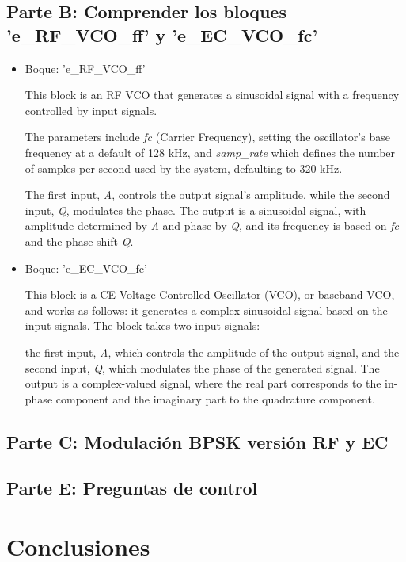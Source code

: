\documentclass{journal}[IEEEtran, twocolumn]             %
\begin{document}
\begin{multicols}{2}
   
\subsection{Parte B: Comprender los bloques 'e\_RF\_VCO\_ff' y 'e\_EC\_VCO\_fc'}

\begin{itemize}
 
   \item Boque: 'e\_RF\_VCO\_ff'

This block is an RF VCO that generates a sinusoidal signal with a frequency controlled by input signals. 

The parameters include \textit{fc} (Carrier Frequency), setting the oscillator's base frequency at a default of 128 kHz, and \textit{samp\_rate} which defines the number of samples per second used by the system, defaulting to 320 kHz.
  
The first input, \textit{A}, controls the output signal's amplitude, while the second input, \textit{Q}, modulates the phase. The output is a sinusoidal signal, with amplitude determined by \textit{A} and phase by \textit{Q}, and its frequency is based on \textit{fc} and the phase shift \textit{Q}.

    \item Boque: 'e\_EC\_VCO\_fc'

This block is a CE Voltage-Controlled Oscillator (VCO), or baseband VCO, and works as follows: it generates a complex sinusoidal signal based on the input signals. The block takes two input signals: 

the first input, \textit{A}, which controls the amplitude of the output signal, and the second input, \textit{Q}, which modulates the phase of the generated signal. The output is a complex-valued signal, where the real part corresponds to the in-phase component and the imaginary part to the quadrature component.
 
\end{itemize}

\subsection{Parte C: Modulación BPSK versión RF y EC}

\subsection{Parte E: Preguntas de control}

\section{Conclusiones}


\end{multicols}
\end{document}
